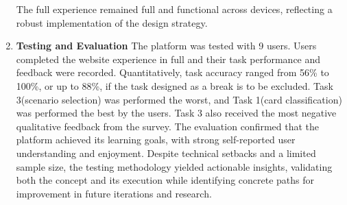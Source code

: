 \begin{enumerate}
    The full experience remained full and functional across devices, reflecting a robust implementation of the design strategy.
    \item \textbf{Testing and Evaluation} The platform was tested with 9 users. 
    Users completed the website experience in full and their task performance and feedback were recorded. 
    Quantitatively, task accuracy ranged from 56\% to 100\%, or up to 88\%, if the task designed as a break is to be excluded. 
    Task 3(scenario selection) was performed the worst, and Task 1(card classification) was performed the best by the users. 
    Task 3 also received the most negative qualitative feedback from the survey. 
    The evaluation confirmed that the platform achieved its learning goals, with strong self-reported user understanding and enjoyment. 
    Despite technical setbacks and a limited sample size, the testing methodology yielded actionable insights, validating both the concept and its execution while identifying concrete paths for improvement in future iterations and research.
\end{enumerate}

\newpage
